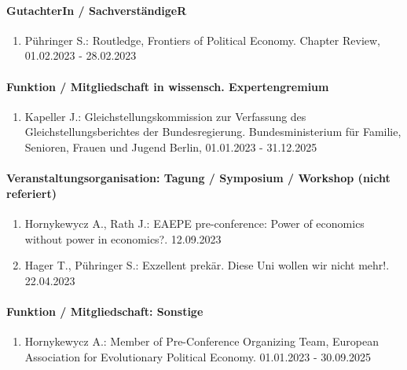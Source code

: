 \paragraph{GutachterIn / SachverständigeR}
\begin{enumerate}[leftmargin=*, labelsep=0.5cm]
\item Pühringer S.: Routledge, Frontiers of Political Economy. Chapter Review, 01.02.2023 - 28.02.2023
\end{enumerate}
\paragraph{Funktion / Mitgliedschaft in wissensch. Expertengremium}
\begin{enumerate}[leftmargin=*, labelsep=0.5cm]
\item Kapeller J.: Gleichstellungskommission zur Verfassung des Gleichstellungsberichtes der Bundesregierung. Bundesministerium für Familie, Senioren, Frauen und Jugend Berlin, 01.01.2023 - 31.12.2025
\end{enumerate}
\paragraph{Veranstaltungsorganisation: Tagung / Symposium / Workshop (nicht referiert)}
\begin{enumerate}[leftmargin=*, labelsep=0.5cm]
\item Hornykewycz A., Rath J.: EAEPE pre-conference: Power of economics without power in economics?. 12.09.2023
\item Hager T., Pühringer S.: Exzellent prekär. Diese Uni wollen wir nicht mehr!. 22.04.2023
\end{enumerate}
\paragraph{Funktion / Mitgliedschaft: Sonstige}
\begin{enumerate}[leftmargin=*, labelsep=0.5cm]
\item Hornykewycz A.: Member of Pre-Conference Organizing Team, European Association for Evolutionary Political Economy. 01.01.2023 - 30.09.2025
\end{enumerate}
